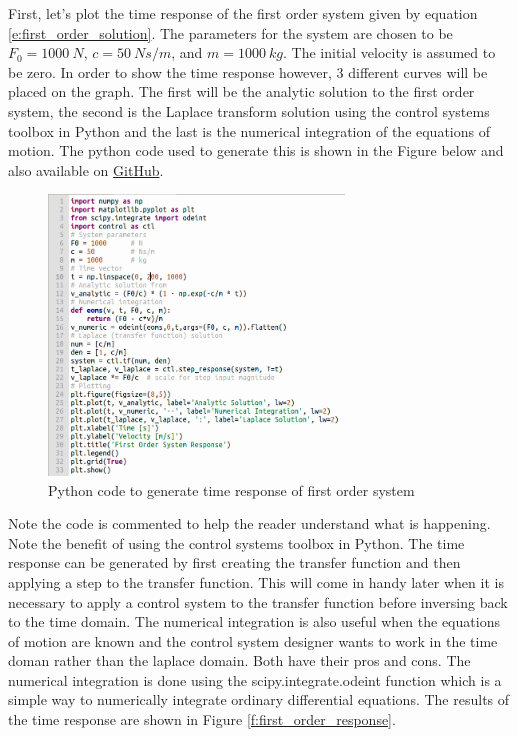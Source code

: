 First, let's plot the time response of the first order system given by equation \ref{e:first_order_solution}. The parameters for the system are chosen to be $F_0=1000~N$, $c=50~Ns/m$, and $m=1000~kg$. The initial velocity is assumed to be zero. In order to show the time response however, 3 different curves will be placed on the graph. The first will be the analytic solution to the first order system, the second is the Laplace transform solution using the control systems toolbox in Python and the last is the numerical integration of the equations of motion. The python code used to generate this is shown in the Figure below and also available on \href{https://github.com/cmontalvo251/Python/blob/master/controls/first_order_system.py}{GitHub}.
\begin{figure}[H]
\centering
\includegraphics[width=0.7\textwidth]{Figures/first_order_code.png}
\caption{Python code to generate time response of first order system}
\label{f:first_order_code}
\end{figure}
Note the code is commented to help the reader understand what is happening. Note the benefit of using the control systems toolbox in Python. The time response can be generated by first creating the transfer function and then applying a step to the transfer function. This will come in handy later when it is necessary to apply a control system to the transfer function before inversing back to the time domain. The numerical integration is also useful when the equations of motion are known and the control system designer wants to work in the time doman rather than the laplace domain. Both have their pros and cons. The numerical integration is done using the scipy.integrate.odeint function which is a simple way to numerically integrate ordinary differential equations. The results of the time response are shown in Figure \ref{f:first_order_response}.
